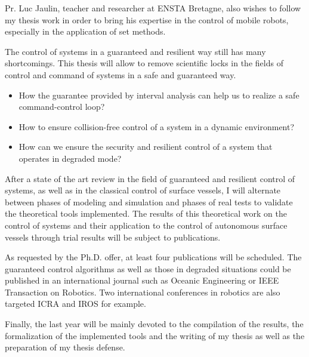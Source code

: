 \documentclass[11pt, a4paper]{awesome-cv}
\begin{document}
\begin{cvletter}
			Pr. Luc Jaulin, teacher and researcher at ENSTA Bretagne, also wishes to follow my thesis work in order to bring his expertise in the control of mobile robots, especially in the application of set methods. 
			

			The control of systems in a guaranteed and resilient way still has many shortcomings. This thesis will allow to remove scientific locks in the fields of control and command of systems in a safe and guaranteed way.

			\begin{itemize}[noitemsep,topsep=0pt,parsep=0pt,partopsep=0pt]
				\item How the guarantee provided by interval analysis can help us to realize a safe command-control loop?
				\item How to ensure collision-free control of a system in a dynamic environment?
				\item How can we ensure the security and resilient control of a system that operates in degraded mode?
			\end{itemize}

		

			After a state of the art review in the field of guaranteed and resilient control of systems, as well as in the classical control of surface vessels, I will alternate between phases of modeling and simulation and phases of real tests to validate the theoretical tools implemented. The results of this theoretical work on the control of systems and their application to the control of autonomous surface vessels through trial results will be subject to publications.
			
			As requested by the Ph.D. offer, at least four publications will be scheduled. The guaranteed control algorithms as well as those in degraded situations could be published in an international journal such as Oceanic Engineering or IEEE Transaction on Robotics. Two international conferences in robotics are also targeted \textsc{ICRA} and \textsc{IROS} for example.

			Finally, the last year will be mainly devoted to the compilation of the results, the formalization of the implemented tools and the writing of my thesis as well as the preparation of my thesis defense.

\end{cvletter}
\end{document}
